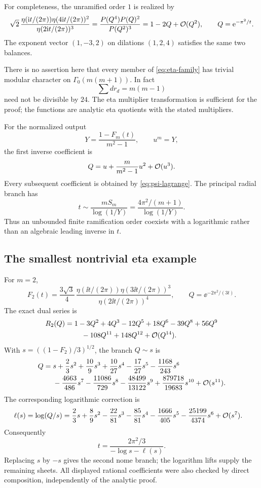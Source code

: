 For completeness, the unramified order \(1\) is realized by
\[
 \sqrt2\,\frac{\eta(\mathrm i t/(2\pi))\eta(4\mathrm i t/(2\pi))^2}
                  {\eta(2\mathrm i t/(2\pi))^3}
 =\frac{P(Q^4)P(Q)^2}{P(Q^2)^3}
 =1-2Q+\mathcal O(Q^2),\qquad Q=\mathrm e^{-\pi^2/t}.
\]
The exponent vector \((1,-3,2)\) on dilations \((1,2,4)\)
satisfies the same two balances.

There is no assertion here that every member of
\cref{eq:eta-family} has trivial modular character on
\(\Gamma_0(m(m+1))\).
In fact
\[
 \sum d r_d=m(m-1)
\]
need not be divisible by \(24\).
The eta multiplier transformation is sufficient for the proof;
the functions are analytic eta quotients with the stated
multipliers.

For the normalized output
\[
 Y=\frac{1-F_m(t)}{m^2-1},\qquad u^m=Y,
\]
the first inverse coefficient is
\[
 Q=u+\frac{m}{m^2-1}u^2+\mathcal O(u^3).
\]
Every subsequent coefficient is obtained by
\cref{eq:psi-lagrange}.
The principal radial branch has
\[
 t\sim \frac{mS_m}{\log(1/Y)}
       =\frac{4\pi^2/(m+1)}{\log(1/Y)}.
\]
Thus an unbounded finite ramification order coexists with a
logarithmic rather than an algebraic leading inverse in \(t\).

\subsection{The smallest nontrivial eta example}

For \(m=2\),
\[
 F_2(t)=\frac{3\sqrt3}{4}\,
 \frac{\eta(\ii t/(2\pi))\eta(3\ii t/(2\pi))^3}
      {\eta(2\ii t/(2\pi))^4},
 \qquad Q=\ee^{-2\pi^2/(3t)}.
\]
The exact dual series is
\begin{align}
 R_2(Q)={}&1-3Q^2+4Q^3-12Q^5+18Q^6
             -39Q^8+56Q^9\notag\\
          &\quad{}-108Q^{11}+148Q^{12}+\mathcal O(Q^{14}).
 \label{eq:R2}
\end{align}
With \(s=((1-F_2)/3)^{1/2}\), the branch \(Q\sim s\) is
\begin{align}
 Q={}&s+\frac23s^2+\frac{10}{9}s^3+\frac{10}{27}s^4
       -\frac{17}{27}s^5-\frac{1168}{243}s^6\notag\\
    &-\frac{4663}{486}s^7-\frac{11086}{729}s^8
       -\frac{48499}{13122}s^9
       +\frac{879718}{19683}s^{10}
       +\mathcal O(s^{11}).
 \label{eq:eta-example-Q}
\end{align}
The corresponding logarithmic correction is
\begin{align}
 \ell(s)=\log(Q/s)={}&
 \frac23s+\frac89s^2-\frac{22}{81}s^3-\frac{85}{81}s^4
 -\frac{1666}{405}s^5-\frac{25199}{4374}s^6
 +\mathcal O(s^7).\label{eq:eta-example-ell}
\end{align}
Consequently
\[
 t=\frac{2\pi^2/3}{-\log s-\ell(s)}.
\]
Replacing \(s\) by \(-s\) gives the second nome branch; the
logarithm lifts supply the remaining sheets.
All displayed rational coefficients were also checked by direct
composition, independently of the analytic proof.

